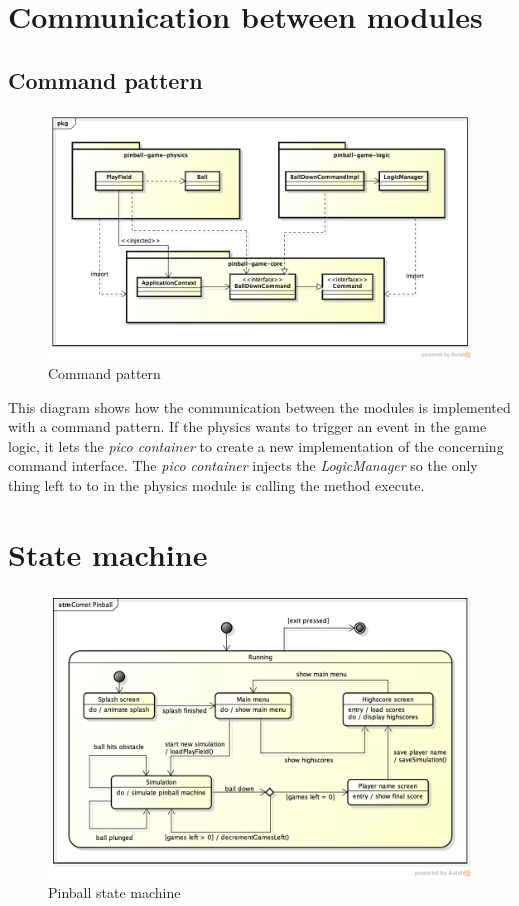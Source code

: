 \documentclass[fontsize=12pt,
               paper=a4,
               twoside=false,
               parskip=half,
               ]{scrartcl}
\begin{document}
\section{Communication between modules}
\subsection{Command pattern}

\begin{figure}[h!]
	\centering
	\includegraphics[width=15.5cm]{./img/command-pattern1.png}
	\caption[Command pattern]{Command pattern}
	\label{fig:command_pattern}
\end{figure}

This diagram shows how the communication between the modules is implemented with a command pattern. If the physics wants to trigger an event in the game logic, it lets the \emph{pico container} to create a new implementation of the concerning command interface. The \emph{pico container} injects the \emph{LogicManager} so the only thing left to to in the physics module is calling the method execute.


\section{State machine}

\begin{figure}[h!]
	\centering
	\includegraphics[width=15.5cm]{./img/state-machine.png}
	\caption[Pinball state machine]{Pinball state machine}
	\label{fig:command_pattern}
\end{figure}
\end{document}

